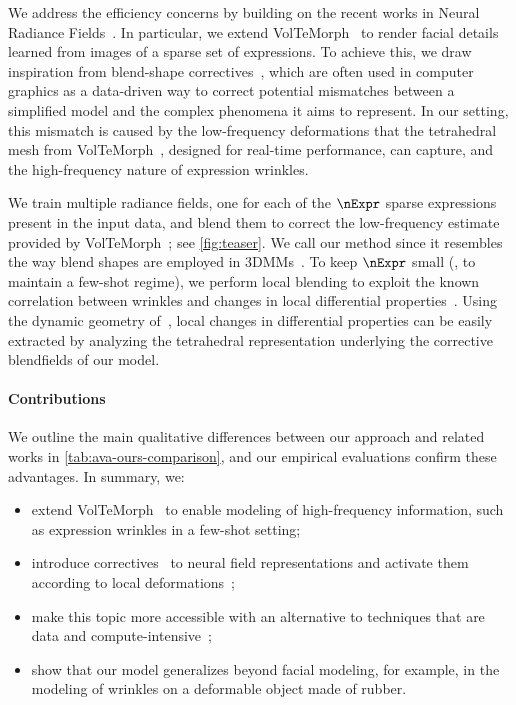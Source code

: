   We address the efficiency concerns by building on the recent works in Neural
  Radiance Fields~\cite{ggarbin2024voltemorphxu2022deforming,yuan2022nerf}.
  In particular, we extend VolTeMorph~\cite{garbin2024voltemorph} to render
  facial details learned from images of a sparse set of expressions.
  To achieve this, we draw inspiration from blend-shape
  correctives~\cite{lewis2014practice}, which are often used in computer
  graphics as a data-driven way to correct potential mismatches between a
  simplified model and the complex phenomena it aims to represent.
  In our setting, this mismatch is caused by the low-frequency deformations
  that the tetrahedral mesh from VolTeMorph~\cite{garbin2024voltemorph},
  designed for real-time performance, can capture, and the high-frequency
  nature of expression \mbox{wrinkles}.

  We train multiple radiance fields, one for each of the $\nExpr$ sparse
  expressions present in the input data, and blend them to correct the
  low-frequency estimate provided by VolTeMorph~\cite{garbin2024voltemorph};
  see \cref{fig:teaser}.
  We call our method \textit{\methodname{}} since it resembles the way blend
  shapes are employed in 3DMMs~\cite{blanz1999morphable}.
  To keep $\nExpr$ small (\ie, to maintain a few-shot regime), we perform
  local blending to exploit the known correlation between wrinkles and changes
  in local differential properties~\cite{irving2004invertible, raman2022mesh}.
  Using the dynamic geometry of~\cite{garbin2024voltemorph}, local changes in
  differential properties can be easily extracted by analyzing the tetrahedral
  representation underlying the corrective blendfields of our model.

  \paragraph{Contributions}
    We outline the main qualitative differences between our approach and
    related works in \cref{tab:ava-ours-comparison}, and our empirical
    evaluations confirm these advantages.
    In summary, we:
    \begin{itemize}
      \item extend VolTeMorph~\cite{garbin2024voltemorph} to enable modeling of high-frequency information, such as expression wrinkles in a few-shot setting;
      \item introduce correctives~\cite{blanz1999morphable} to neural field representations and activate them according to local deformations~\cite{raman2022mesh};
      \item
            make this topic more accessible
            with an alternative to techniques that are data and compute-intensive~\cite{cao2022authentic};
      \item show that our model generalizes beyond facial modeling, for example, in the modeling of wrinkles on a deformable object made of rubber.
    \end{itemize}